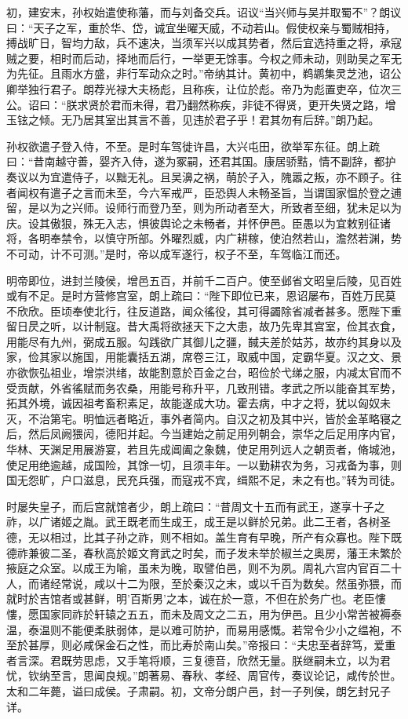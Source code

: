 \documentclass[12pt,UTF8]{ctexbook}
\begin{document}
初，建安末，孙权始遣使称藩，而与刘备交兵。诏议“当兴师与吴并取蜀不”？朗议曰：“天子之军，重於华、岱，诚宜坐曜天威，不动若山。假使权亲与蜀贼相持，搏战旷日，智均力敌，兵不速决，当须军兴以成其势者，然后宜选持重之将，承寇贼之要，相时而后动，择地而后行，一举更无馀事。今权之师未动，则助吴之军无为先征。且雨水方盛，非行军动众之时。”帝纳其计。黄初中，鹈鹕集灵芝池，诏公卿举独行君子。朗荐光禄大夫杨彪，且称疾，让位於彪。帝乃为彪置吏卒，位次三公。诏曰：“朕求贤於君而未得，君乃翻然称疾，非徒不得贤，更开失贤之路，增玉铉之倾。无乃居其室出其言不善，见违於君子乎！君其勿有后辞。”朗乃起。

孙权欲遣子登入侍，不至。是时车驾徙许昌，大兴屯田，欲举军东征。朗上疏曰：“昔南越守善，婴齐入侍，遂为冢嗣，还君其国。康居骄黠，情不副辞，都护奏议以为宜遣侍子，以黜无礼。且吴濞之祸，萌於子入，隗嚣之叛，亦不顾子。往者闻权有遣子之言而未至，今六军戒严，臣恐舆人未畅圣旨，当谓国家愠於登之逋留，是以为之兴师。设师行而登乃至，则为所动者至大，所致者至细，犹未足以为庆。设其傲狠，殊无入志，惧彼舆论之未畅者，并怀伊邑。臣愚以为宜敕别征诸将，各明奉禁令，以慎守所部。外曜烈威，内广耕稼，使泊然若山，澹然若渊，势不可动，计不可测。”是时，帝以成军遂行，权子不至，车驾临江而还。

明帝即位，进封兰陵侯，增邑五百，并前千二百户。使至邺省文昭皇后陵，见百姓或有不足。是时方营修宫室，朗上疏曰：“陛下即位已来，恩诏屡布，百姓万民莫不欣欣。臣顷奉使北行，往反道路，闻众徭役，其可得蠲除省减者甚多。愿陛下重留日昃之听，以计制寇。昔大禹将欲拯天下之大患，故乃先卑其宫室，俭其衣食，用能尽有九州，弼成五服。勾践欲广其御儿之疆，馘夫差於姑苏，故亦约其身以及家，俭其家以施国，用能囊括五湖，席卷三江，取威中国，定霸华夏。汉之文、景亦欲恢弘祖业，增崇洪绪，故能割意於百金之台，昭俭於弋绨之服，内减太官而不受贡献，外省徭赋而务农桑，用能号称升平，几致刑错。孝武之所以能奋其军势，拓其外境，诚因祖考畜积素足，故能遂成大功。霍去病，中才之将，犹以匈奴未灭，不治第宅。明恤远者略近，事外者简内。自汉之初及其中兴，皆於金革略寝之后，然后凤阙猥闶，德阳并起。今当建始之前足用列朝会，崇华之后足用序内官，华林、天渊足用展游宴，若且先成阊阖之象魏，使足用列远人之朝贡者，脩城池，使足用绝逾越，成国险，其馀一切，且须丰年。一以勤耕农为务，习戎备为事，则国无怨旷，户口滋息，民充兵强，而寇戎不宾，缉熙不足，未之有也。”转为司徒。

时屡失皇子，而后宫就馆者少，朗上疏曰：“昔周文十五而有武王，遂享十子之祚，以广诸姬之胤。武王既老而生成王，成王是以鲜於兄弟。此二王者，各树圣德，无以相过，比其子孙之祚，则不相如。盖生育有早晚，所产有众寡也。陛下既德祚兼彼二圣，春秋高於姬文育武之时矣，而子发未举於椒兰之奥房，藩王未繁於掖庭之众室。以成王为喻，虽未为晚，取譬伯邑，则不为夙。周礼六宫内官百二十人，而诸经常说，咸以十二为限，至於秦汉之末，或以千百为数矣。然虽弥猥，而就时於吉馆者或甚鲜，明'百斯男'之本，诚在於一意，不但在於务广也。老臣慺慺，愿国家同祚於轩辕之五五，而未及周文之二五，用为伊邑。且少小常苦被褥泰温，泰温则不能便柔肤弱体，是以难可防护，而易用感慨。若常令少小之缊袍，不至於甚厚，则必咸保金石之性，而比寿於南山矣。”帝报曰：“夫忠至者辞笃，爱重者言深。君既劳思虑，又手笔将顺，三复德音，欣然无量。朕继嗣未立，以为君忧，钦纳至言，思闻良规。”朗著易、春秋、孝经、周官传，奏议论记，咸传於世。太和二年薨，谥曰成侯。子肃嗣。初，文帝分朗户邑，封一子列侯，朗乞封兄子详。
\end{document}
